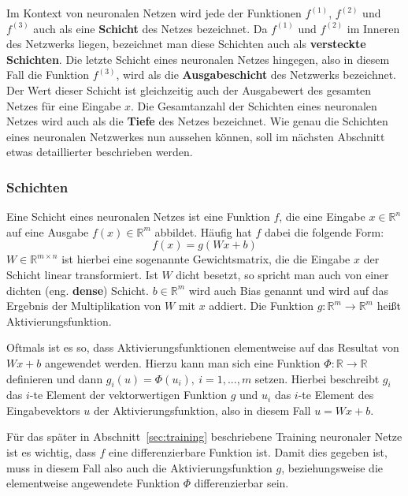 Im Kontext von neuronalen Netzen wird jede der Funktionen
$f^{(1)}$, $f^{(2)}$ und $f^{(3)}$ auch als eine \textbf{Schicht} des
Netzes bezeichnet.
Da $f^{(1)}$ und $f^{(2)}$ im Inneren des Netzwerks liegen, bezeichnet man
diese Schichten auch als \textbf{versteckte Schichten}.
Die letzte Schicht eines neuronalen Netzes hingegen, also in diesem
Fall die Funktion $f^{(3)}$, wird als die \textbf{Ausgabeschicht} des
Netzwerks bezeichnet. Der Wert dieser Schicht ist gleichzeitig
auch der Ausgabewert des gesamten Netzes f\"ur eine Eingabe $x$.
Die Gesamtanzahl der Schichten eines neuronalen Netzes wird auch
als die \textbf{Tiefe} des Netzes bezeichnet.
Wie genau die Schichten eines neuronalen Netzwerkes nun aussehen k\"onnen,
soll im n\"achsten Abschnitt etwas detaillierter beschrieben werden.

\subsubsection{Schichten}

Eine Schicht eines neuronalen Netzes ist eine Funktion $f$, die eine
Eingabe $x \in \mathbb{R}^n$ auf eine Ausgabe $f(x) \in \mathbb{R}^m$
abbildet. H\"aufig hat $f$ dabei die folgende Form:
\begin{equation}
    f(x) = g(Wx + b)
\end{equation}
$W \in \mathbb{R}^{m \times n}$ ist hierbei eine sogenannte Gewichtsmatrix,
die die Eingabe $x$ der Schicht linear transformiert.
Ist $W$ dicht besetzt, so spricht man auch von einer dichten
(eng. \textbf{dense}) Schicht.
$b \in \mathbb{R}^m$ wird auch Bias genannt und wird auf das Ergebnis der
Multiplikation von $W$ mit $x$ addiert.
Die Funktion $g: \mathbb{R}^m \rightarrow \mathbb{R}^m$ hei{\ss}t
Aktivierungsfunktion.

Oftmals ist es so, dass Aktivierungsfunktionen elementweise auf das
Resultat von $Wx + b$ angewendet werden. Hierzu kann man sich eine
Funktion $\Phi: \mathbb{R} \rightarrow \mathbb{R}$ definieren und dann
$g_i(u) = \Phi(u_i), \  i=1,...,m$ setzen. Hierbei beschreibt $g_i$
das $i$-te Element der vektorwertigen Funktion $g$ und $u_i$ das $i$-te
Element des Eingabevektors $u$ der Aktivierungsfunktion,
also in diesem Fall $u = Wx + b$.

F\"ur das sp\"ater in Abschnitt~\ref{sec:training} beschriebene
Training neuronaler Netze ist es wichtig, dass $f$ eine differenzierbare
Funktion ist. Damit dies gegeben ist, muss in diesem Fall also auch die
Aktivierungsfunktion $g$, beziehungsweise die elementweise angewendete
Funktion $\Phi$ differenzierbar sein.

